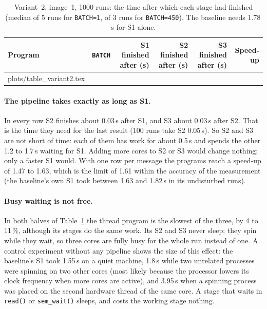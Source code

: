 \documentclass[11pt,a4paper]{article}
\makeatletter
\newcommand{\rows}[1]{\@@input plots/#1.tex }
\makeatother
\begin{document}
\begin{table}[H]
\centering\small
\begin{tabular}{@{}lrrrrr@{}}
\toprule
Program & \texttt{BATCH} & S1 finished after (s) & S2 finished after (s) & S3 finished after (s) & Speed-up \\
\midrule
\rows{table_variant2}
\bottomrule
\end{tabular}
\caption{Variant~2, image~1, 1000 runs: the time after which each stage had finished (median of 5
runs for \texttt{BATCH=1}, of 3 runs for \texttt{BATCH=450}). The baseline needs 1.78\,s for S1 alone.}
\label{tab:variant2}
\end{table}

\paragraph{The pipeline takes exactly as long as S1.} In every row S2 finishes about 0.03\,s after
S1, and S3 about 0.03\,s after S2. That is the time they need for the last result (100 runs take
S2 0.05\,s). So S2 and S3 are not short of time: each of them has work for about 0.5\,s and
spends the other 1.2 to 1.7\,s waiting for S1. Adding more cores to S2 or S3 would change nothing;
only a faster S1 would. With one row per message the programs reach a speed-up of 1.47 to 1.63,
which is the limit of 1.61 within the accuracy of the measurement (the baseline's own S1 took
between 1.63 and 1.82\,s in its undisturbed runs).

\paragraph{Busy waiting is not free.} In both halves of Table~\ref{tab:variant2} the thread program
is the slowest of the three, by 4 to 11\,\%, although its stages do the same work. Its S2 and S3
never sleep; they spin while they wait, so three cores are fully busy for the whole run instead of
one. A control experiment without any pipeline shows the size of this effect: the baseline's S1
took 1.55\,s on a quiet machine, 1.8\,s while two unrelated processes were spinning on two other
cores (most likely because the processor lowers its clock frequency when more cores are active),
and 3.95\,s when a spinning process was placed on the second hardware thread of the same core. A
stage that waits in \texttt{read()} or \texttt{sem\_wait()} sleeps, and costs the working stage
nothing.
\end{document}
